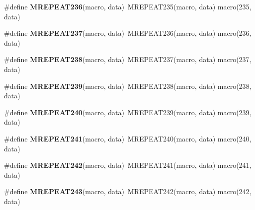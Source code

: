 \begin{DoxyCompactItemize}
\item 
\hypertarget{group__group__sam0__utils__mrepeat_ga91157712363f58affa1ae6b2feb50747}{}\#define {\bfseries M\+R\+E\+P\+E\+A\+T236}(macro,  data)~M\+R\+E\+P\+E\+A\+T235(macro, data)   macro(235, data)\label{group__group__sam0__utils__mrepeat_ga91157712363f58affa1ae6b2feb50747}

\item 
\hypertarget{group__group__sam0__utils__mrepeat_ga0e49a6a0b3047b2d3ec37912f6f15c7a}{}\#define {\bfseries M\+R\+E\+P\+E\+A\+T237}(macro,  data)~M\+R\+E\+P\+E\+A\+T236(macro, data)   macro(236, data)\label{group__group__sam0__utils__mrepeat_ga0e49a6a0b3047b2d3ec37912f6f15c7a}

\item 
\hypertarget{group__group__sam0__utils__mrepeat_ga22a583e1c58865d54827789830f38953}{}\#define {\bfseries M\+R\+E\+P\+E\+A\+T238}(macro,  data)~M\+R\+E\+P\+E\+A\+T237(macro, data)   macro(237, data)\label{group__group__sam0__utils__mrepeat_ga22a583e1c58865d54827789830f38953}

\item 
\hypertarget{group__group__sam0__utils__mrepeat_gac7ec468a3f485459ffcac683dd035e65}{}\#define {\bfseries M\+R\+E\+P\+E\+A\+T239}(macro,  data)~M\+R\+E\+P\+E\+A\+T238(macro, data)   macro(238, data)\label{group__group__sam0__utils__mrepeat_gac7ec468a3f485459ffcac683dd035e65}

\item 
\hypertarget{group__group__sam0__utils__mrepeat_ga88afce60134e666d2674813cc05b06aa}{}\#define {\bfseries M\+R\+E\+P\+E\+A\+T240}(macro,  data)~M\+R\+E\+P\+E\+A\+T239(macro, data)   macro(239, data)\label{group__group__sam0__utils__mrepeat_ga88afce60134e666d2674813cc05b06aa}

\item 
\hypertarget{group__group__sam0__utils__mrepeat_gac11f0502fa2d597c4b9a18351f87384a}{}\#define {\bfseries M\+R\+E\+P\+E\+A\+T241}(macro,  data)~M\+R\+E\+P\+E\+A\+T240(macro, data)   macro(240, data)\label{group__group__sam0__utils__mrepeat_gac11f0502fa2d597c4b9a18351f87384a}

\item 
\hypertarget{group__group__sam0__utils__mrepeat_gae6db0e42b34f92c59c76e0364573db92}{}\#define {\bfseries M\+R\+E\+P\+E\+A\+T242}(macro,  data)~M\+R\+E\+P\+E\+A\+T241(macro, data)   macro(241, data)\label{group__group__sam0__utils__mrepeat_gae6db0e42b34f92c59c76e0364573db92}

\item 
\hypertarget{group__group__sam0__utils__mrepeat_ga3780c0d880e8f0fef0b734f8491388a1}{}\#define {\bfseries M\+R\+E\+P\+E\+A\+T243}(macro,  data)~M\+R\+E\+P\+E\+A\+T242(macro, data)   macro(242, data)\label{group__group__sam0__utils__mrepeat_ga3780c0d880e8f0fef0b734f8491388a1}


\end{DoxyCompactItemize}
